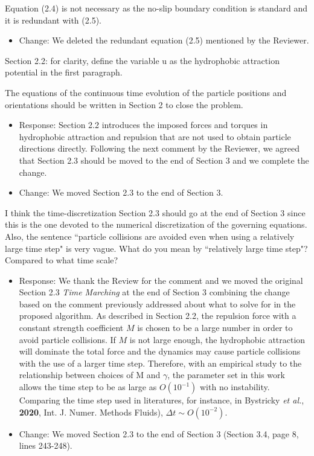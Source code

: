 \documentclass[11pt]{article}
\newcommand{\comment}[1]{{\color{blue} #1}}
\begin{document}
\noindent
\comment{Equation (2.4) is not necessary as the no-slip boundary
condition is standard and it is redundant with (2.5).}
\begin{itemize}
  \item Change: We deleted the redundant equation (2.5) mentioned by the Reviewer.
\end{itemize}

\noindent
\comment{Section 2.2: for clarity, define the variable u as the
hydrophobic attraction potential in the first paragraph.}

\noindent
\comment{The equations of the continuous time evolution of the particle
positions and orientations should be written in Section 2 to close the
problem.}
\begin{itemize}
  \item Response: Section 2.2 introduces the imposed forces and torques in hydrophobic attraction and repulsion that are not used to obtain particle directions directly. Following the next comment by 
the Reviewer, we agreed that Section 2.3 should be moved to the end of Section 3 and we complete the change.
\item Change: We moved Section 2.3 to the end of Section 3.
\end{itemize}

\noindent
\comment{I think the time-discretization Section 2.3 should go at the
end of Section 3 since this is the one devoted to the numerical
discretization of the governing equations. Also, the sentence ``particle
collisions are avoided even when using a relatively large time step" is
very vague.  What do you mean by ``relatively large time step"? Compared
to what time scale?}
\begin{itemize}
  \item Response: We thank the Review for the comment and we moved the original Section 2.3 {\it Time Marching} at the end of Section 3 combining the change based on the comment previously addressed about what to solve for in the proposed algorithm. 
As described in Section 2.2, the repulsion force with a constant strength coefficient $M$ is chosen 
to be a large number in order to avoid particle collisions. If $M$ is not large enough, the hydrophobic attraction will dominate the total force and the dynamics may cause particle collisions with the use of a larger time step. Therefore, with an empirical study to the relationship between 
choices of M and $\gamma$, the parameter set in this work allows the time step to be as large as
$O(10^{-1})$ with no instability. Comparing the time step used in literatures, for instance, in Bystricky {\sl et al.}, {\bf 2020}, Int. J. Numer. Methods Fluids), $\Delta t\sim O(10^{-2})$.
\item Change: We moved Section 2.3 to the end of Section 3 (Section 3.4, page 8, lines 243-248).
\end{itemize}
\end{document}
